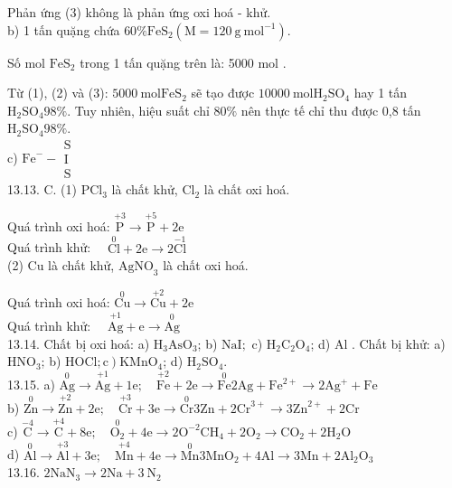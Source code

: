 \documentclass[10pt]{article}
\begin{document}
Phản ứng (3) không là phản ứng oxi hoá - khử.\\
b) 1 tấn quặng chứa $60 \% \mathrm{FeS}_{2}\left(\mathrm{M}=120 \mathrm{~g} \mathrm{~mol}^{-1}\right)$.

Số mol $\mathrm{FeS}_{2}$ trong 1 tấn quặng trên là: 5000 mol .

Từ (1), (2) và (3): $5000 \mathrm{~mol} \mathrm{FeS}_{2}$ sẽ tạo được $10000 \mathrm{~mol} \mathrm{H}_{2} \mathrm{SO}_{4}$ hay 1 tấn $\mathrm{H}_{2} \mathrm{SO}_{4} 98 \%$. Tuy nhiên, hiệu suất chỉ $80 \%$ nên thực tế chỉ thu được 0,8 tấn $\mathrm{H}_{2} \mathrm{SO}_{4} 98 \%$.\\
c) $\mathrm{Fe}^{-}-\begin{gathered}\mathrm{S} \\ \mathrm{I} \\ \mathrm{S}\end{gathered}$\\
13.13. C. (1) $\mathrm{PCl}_{3}$ là chất khử, $\mathrm{Cl}_{2}$ là chất oxi hoá.

Quá trình oxi hoá: $\stackrel{+3}{\mathrm{P}} \rightarrow \stackrel{+5}{\mathrm{P}}+2 \mathrm{e}$\\
Quá trình khử: $\quad \stackrel{0}{\mathrm{Cl}}+2 \mathrm{e} \rightarrow 2 \stackrel{-1}{\mathrm{Cl}}$\\
(2) Cu là chất khử, $\mathrm{AgNO}_{3}$ là chất oxi hoá.

Quá trình oxi hoá: $\stackrel{0}{\mathrm{Cu}} \rightarrow \stackrel{+2}{\mathrm{Cu}}+2 \mathrm{e}$\\
Quá trình khử: $\quad \stackrel{+1}{\mathrm{Ag}}+\mathrm{e} \rightarrow \stackrel{0}{\mathrm{Ag}}$\\
13.14. Chất bị oxi hoá: a) $\mathrm{H}_{3} \mathrm{AsO}_{3}$; b) $\mathrm{NaI} ;$ c) $\mathrm{H}_{2} \mathrm{C}_{2} \mathrm{O}_{4}$; d) Al . Chất bị khử: a) $\mathrm{HNO}_{3}$; b) $\left.\mathrm{HOCl} ; \mathrm{c}\right) \mathrm{KMnO}_{4}$; d) $\mathrm{H}_{2} \mathrm{SO}_{4}$.\\
13.15. a) $\stackrel{0}{\mathrm{Ag}} \rightarrow \stackrel{+1}{\mathrm{Ag}}+1 \mathrm{e} ; \quad \stackrel{+2}{\mathrm{Fe}}+2 \mathrm{e} \rightarrow \stackrel{0}{\mathrm{Fe}} 2 \mathrm{Ag}+\mathrm{Fe}^{2+} \rightarrow 2 \mathrm{Ag}^{+}+\mathrm{Fe}$\\
b) $\stackrel{0}{\mathrm{Zn}} \rightarrow \stackrel{+2}{\mathrm{Zn}}+2 \mathrm{e} ; \quad \stackrel{+3}{\mathrm{Cr}}+3 \mathrm{e} \rightarrow \stackrel{0}{\mathrm{Cr}} 3 \mathrm{Zn}+2 \mathrm{Cr}^{3+} \rightarrow 3 \mathrm{Zn}^{2+}+2 \mathrm{Cr}$\\
c) $\stackrel{-4}{\mathrm{C}} \rightarrow \stackrel{+4}{\mathrm{C}}+8 \mathrm{e} ; \quad \stackrel{0}{\mathrm{O}_{2}}+4 \mathrm{e} \rightarrow 2 \mathrm{O}^{-2} \mathrm{CH}_{4}+2 \mathrm{O}_{2} \rightarrow \mathrm{CO}_{2}+2 \mathrm{H}_{2} \mathrm{O}$\\
d) $\stackrel{0}{\mathrm{Al}} \rightarrow \stackrel{+3}{\mathrm{Al}}+3 \mathrm{e} ; \quad \stackrel{+4}{\mathrm{Mn}}+4 \mathrm{e} \rightarrow \stackrel{0}{\mathrm{Mn}} 3 \mathrm{MnO}_{2}+4 \mathrm{Al} \rightarrow 3 \mathrm{Mn}+2 \mathrm{Al}_{2} \mathrm{O}_{3}$\\
13.16. $2 \mathrm{NaN}_{3} \rightarrow 2 \mathrm{Na}+3 \mathrm{~N}_{2}$
\end{document}
